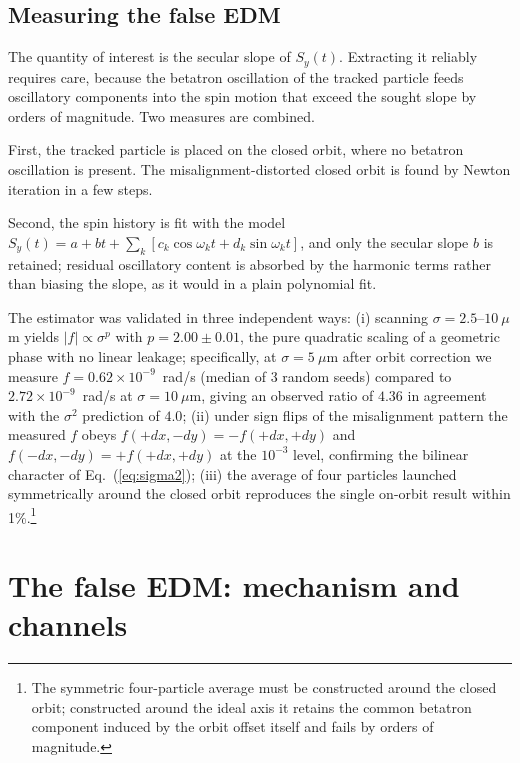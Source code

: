 \documentclass[aps,prab,reprint,superscriptaddress,nofootinbib]{revtex4-2}
\begin{document}
\subsection{Measuring the false EDM}
\label{sec:estimator}

The quantity of interest is the secular slope of $S_y(t)$.  Extracting it
reliably requires care, because the betatron oscillation of the tracked
particle feeds oscillatory components into the spin motion that exceed the
sought slope by orders of magnitude.  Two measures are combined.

First, the tracked particle is placed on the closed orbit, where no betatron
oscillation is present.  The misalignment-distorted closed orbit is found by
Newton iteration in a few steps.

Second, the spin history is fit with the model
$S_y(t) = a + bt + \sum_k \left[c_k\cos\omega_k t + d_k\sin\omega_k t\right]$,
and only the secular slope $b$ is retained; residual oscillatory content is
absorbed by the harmonic terms rather than biasing the slope, as it would in a
plain polynomial fit.

The estimator was validated in three independent ways: (i) scanning
$\sigma = 2.5$--$10~\mu$m yields $|f| \propto \sigma^{p}$ with
$p = 2.00 \pm 0.01$, the pure quadratic scaling of a geometric phase with no
linear leakage; specifically, at $\sigma = 5~\mu$m after orbit correction we
measure $f = 0.62 \times 10^{-9}$~rad/s (median of 3 random seeds) compared to
$2.72 \times 10^{-9}$~rad/s at $\sigma = 10~\mu$m, giving an observed ratio of
$4.36$ in agreement with the $\sigma^2$ prediction of $4.0$; (ii) under sign
flips of the misalignment pattern the measured $f$ obeys $f(+dx,-dy) =
-f(+dx,+dy)$ and $f(-dx,-dy) = +f(+dx,+dy)$ at the $10^{-3}$ level, confirming
the bilinear character of Eq.~(\ref{eq:sigma2}); (iii) the average of four
particles launched symmetrically around the closed orbit reproduces the single
on-orbit result within 1\%.\footnote{The symmetric four-particle average must be
constructed around the closed orbit; constructed around the ideal axis it
retains the common betatron component induced by the orbit offset itself and
fails by orders of magnitude.}


\section{The false EDM: mechanism and channels}
\label{sec:mechanism}
\end{document}
